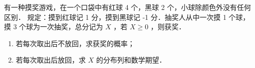 \begin{example}
    有一种摸奖游戏，在一个口袋中有红球 4 个，黑球 2 个，小球除颜色外没有任何区别．
    规定：摸到红球记 1 分，摸到黑球记 -1 分．抽奖人从中一次摸 1 个球，摸 3 个球为一次抽奖，总分记为 $X$ ，若 $X \geq 0$ ，则获奖．
    \begin{enumerate}[(1)]
        \item 若每次取出后不放回，求获奖的概率；
        \item 若每次取出后放回，求 $X$ 的分布列和数学期望．
    \end{enumerate}
\end{example}